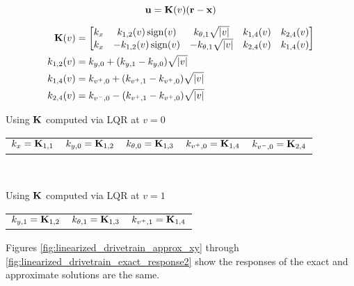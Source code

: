 \begin{theorem}
  \begin{equation*}
    \mathbf{u} = \mathbf{K}(v) (\mathbf{r} - \mathbf{x})
  \end{equation*}

  \begin{align}
    \mathbf{K}(v) &= \begin{bmatrix}
      k_x & k_{1, 2}(v) \operatorname{sign}(v) & k_{\theta, 1} \sqrt{|v|} & k_{1, 4}(v) &
        k_{2, 4}(v) \\
      k_x & -k_{1, 2}(v) \operatorname{sign}(v) & -k_{\theta, 1} \sqrt{|v|} & k_{2, 4}(v) &
        k_{1, 4}(v)
    \end{bmatrix} \\
    k_{1, 2}(v) &= k_{y, 0} + (k_{y, 1} - k_{y, 0}) \sqrt{|v|} \\
    k_{1, 4}(v) &= k_{v^+, 0} + (k_{v^+, 1} - k_{v^+, 0}) \sqrt{|v|} \\
    k_{2, 4}(v) &= k_{v^-, 0} - (k_{v^+, 1} - k_{v^+, 0}) \sqrt{|v|}
  \end{align}

  Using $\mathbf{K}$ computed via LQR at $v = 0$ \\
  \begin{figurekey}
    \begin{tabulary}{\linewidth}{LLLLL}
      $k_x = \mathbf{K}_{1, 1}$ &
        $k_{y, 0} = \mathbf{K}_{1, 2}$ &
        $k_{\theta, 0} = \mathbf{K}_{1, 3}$ &
        $k_{v^+, 0} = \mathbf{K}_{1, 4}$ &
        $k_{v^-, 0} = \mathbf{K}_{2, 4}$ \\
    \end{tabulary} \\
  \end{figurekey}

  Using $\mathbf{K}$ computed via LQR at $v = 1$ \\
  \begin{figurekey}
    \begin{tabulary}{\linewidth}{LLL}
        $k_{y, 1} = \mathbf{K}_{1, 2}$ &
        $k_{\theta, 1} = \mathbf{K}_{1, 3}$ &
        $k_{v^+, 1} = \mathbf{K}_{1, 4}$
    \end{tabulary}
  \end{figurekey}
\end{theorem}

Figures \ref{fig:linearized_drivetrain_approx_xy} through
\ref{fig:linearized_drivetrain_exact_response2} show the responses of the exact
and approximate solutions are the same.

